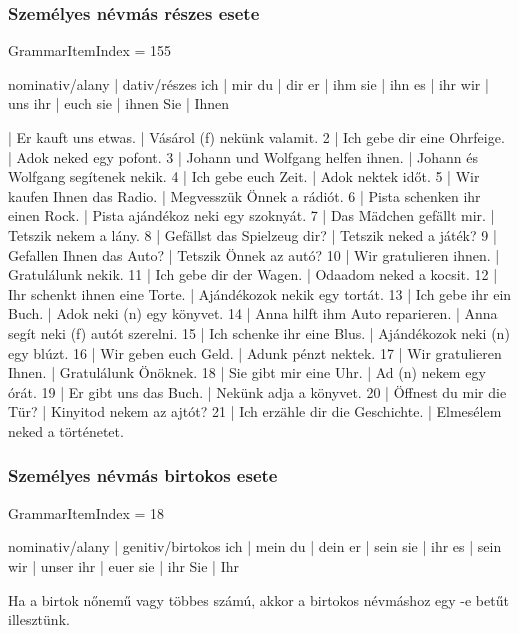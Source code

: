 \documentclass{article}
\newenvironment{desc}{\verbatim}{\endverbatim}
\newenvironment{exmp}{\verbatim}{\endverbatim}
\begin{document}
\subsubsection{Személyes névmás részes esete}

GrammarItemIndex = 155

\begin{desc}
nominativ/alany | dativ/részes 
ich             | mir 
du              | dir 
er              | ihm 
sie             | ihn
es              | ihr 
wir             | uns 
ihr             | euch 
sie             | ihnen  
Sie             | Ihnen 
\end{desc}

\begin{exmp}
1 | Er kauft uns etwas. | Vásárol (f) nekünk valamit.
2 | Ich gebe dir eine Ohrfeige. | Adok neked egy pofont.
3 | Johann und Wolfgang helfen ihnen. | Johann és Wolfgang segítenek nekik.
4 | Ich gebe euch Zeit. | Adok nektek időt.
5 | Wir kaufen Ihnen das Radio. | Megvesszük Önnek a rádiót.
6 | Pista schenken ihr einen Rock. | Pista ajándékoz neki egy szoknyát.
7 | Das Mädchen gefällt mir. | Tetszik nekem a lány.
8 | Gefällst das Spielzeug dir? | Tetszik neked a játék?
9 | Gefallen Ihnen das Auto? | Tetszik Önnek az autó?
10 | Wir gratulieren ihnen. | Gratulálunk nekik.
11 | Ich gebe dir der Wagen. | Odaadom neked a kocsit.
12 | Ihr schenkt ihnen eine Torte. | Ajándékozok nekik egy tortát.
13 | Ich gebe ihr ein Buch. | Adok neki (n) egy könyvet.
14 | Anna hilft ihm Auto reparieren. | Anna segít neki (f) autót szerelni.
15 | Ich schenke ihr eine Blus. | Ajándékozok neki (n) egy blúzt.
16 | Wir geben euch Geld. | Adunk pénzt nektek.
17 | Wir gratulieren Ihnen. | Gratulálunk Önöknek.
18 | Sie gibt mir eine Uhr. | Ad (n) nekem egy órát.
19 | Er gibt uns das Buch. | Nekünk adja a könyvet.
20 | Öffnest du mir die Tür? | Kinyitod nekem az ajtót?
21 | Ich erzähle dir die Geschichte. | Elmesélem neked a történetet.
\end{exmp}

\subsubsection{Személyes névmás birtokos esete}

GrammarItemIndex = 18

\begin{desc}
nominativ/alany | genitiv/birtokos 
ich             | mein
du              | dein
er              | sein
sie             | ihr
es              | sein
wir             | unser
ihr             | euer
sie             | ihr
Sie             | Ihr

Ha a birtok nőnemű vagy többes számú, akkor a birtokos névmáshoz
egy -e betűt illesztünk.
\end{desc}
\end{document}
